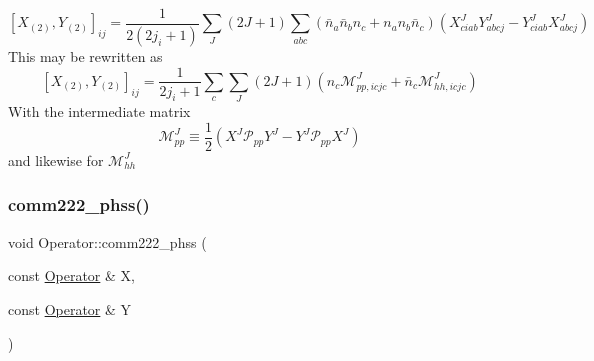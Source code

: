\[ [X_{(2)},Y_{(2)}]_{ij} = \frac{1}{2(2j_i+1)}\sum_{J}(2J+1)\sum_{abc} (\bar{n}_a\bar{n}_bn_c + n_an_b\bar{n}_c) (X^{J}_{ciab} Y^{J}_{abcj} - Y^{J}_{ciab}X^{J}_{abcj}) \] This may be rewritten as \[ [X_{(2)},Y_{(2)}]_{ij} = \frac{1}{2j_i+1} \sum_{c} \sum_{J} (2J+1) \left( n_c \mathcal{M}^{J}_{pp,icjc} + \bar{n}_c\mathcal{M}^{J}_{hh,icjc} \right) \] With the intermediate matrix \[ \mathcal{M}^{J}_{pp} \equiv \frac{1}{2} (X^{J}\mathcal{P}_{pp} Y^{J} - Y^{J}\mathcal{P}_{pp}X^{J}) \] and likewise for $ \mathcal{M}^{J}_{hh} $ \mbox{\label{classOperator_a25b768c4ddceead49af1c7f69d5071ea}} 
\subsubsection{\texorpdfstring{comm222\+\_\+phss()}{comm222\_phss()}}
{\footnotesize\ttfamily void Operator\+::comm222\+\_\+phss (\begin{DoxyParamCaption}\item[{const \hyperlink{classOperator}{Operator} \&}]{X,  }\item[{const \hyperlink{classOperator}{Operator} \&}]{Y }\end{DoxyParamCaption})}

